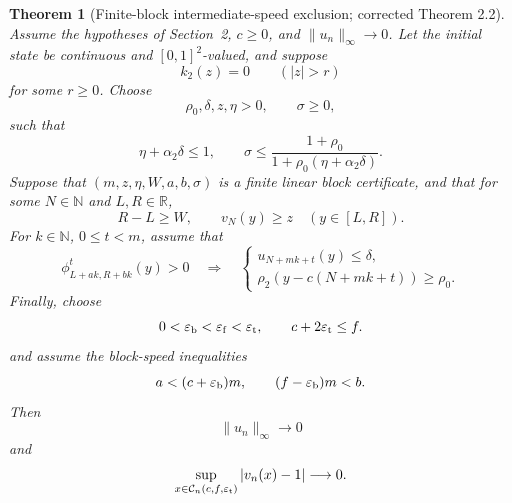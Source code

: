 \documentclass[11pt]{article}
\newtheorem{theorem}{Theorem}[section]
\theoremstyle{definition}
\newcommand{\R}{\mathbb R}
\newcommand{\N}{\mathbb N}
\begin{document}
\begin{theorem}[Finite-block intermediate-speed exclusion; corrected
Theorem 2.2]
\label{thm:global-exclusion}
Assume the hypotheses of Section~2, \(c\geq0\), and
\(\|u_n\|_\infty\to0\).  Let the initial state be continuous and
\([0,1]^2\)-valued, and suppose
\[
  k_2(z)=0\qquad(|z|>r)
\]
for some \(r\geq0\).  Choose
\[
  \rho_0,\delta,z,\eta>0,\qquad \sigma\geq0,
\]
such that
\begin{equation}\label{eq:block-linear-slope}
  \eta+\alpha_2\delta\leq1,
  \qquad
  \sigma\leq
  \frac{1+\rho_0}
       {1+\rho_0(\eta+\alpha_2\delta)}.
\end{equation}
Suppose that \((m,z,\eta,W,a,b,\sigma)\) is a finite linear block
certificate, and that for some \(N\in\N\) and \(L,R\in\R\),
\begin{equation}\label{eq:exclusion-seed}
  R-L\geq W,
  \qquad
  v_N(y)\geq z\quad(y\in[L,R]).
\end{equation}
For \(k\in\N\), \(0\leq t<m\), assume that
\begin{equation}\label{eq:block-support-control}
 \phi_{L+ak,R+bk}^{t}(y)>0
 \quad\Longrightarrow\quad
 \begin{cases}
   u_{N+mk+t}(y)\leq\delta,\\
   \rho_2\!\left(y-c(N+mk+t)\right)\geq\rho_0.
 \end{cases}
\end{equation}
Finally, choose
\begin{equation}\label{eq:exclusion-corridor}
  0<\varepsilon_{\rm b}<\varepsilon_{\rm f}
  <\varepsilon_{\rm t},
  \qquad
  c+2\varepsilon_{\rm t}\leq f.
\end{equation}
and assume the block-speed inequalities
\begin{equation}\label{eq:block-speeds}
  a<(c+\varepsilon_{\rm b})m,
  \qquad
  (f-\varepsilon_{\rm b})m<b.
\end{equation}
Then
\[
  \|u_n\|_\infty\longrightarrow0
\]
and
\[
  \sup_{x\in\mathcal C_n(c,f,\varepsilon_{\rm t})}
  |v_n(x)-1|
  \longrightarrow0.
\]
\end{theorem}
\end{document}
